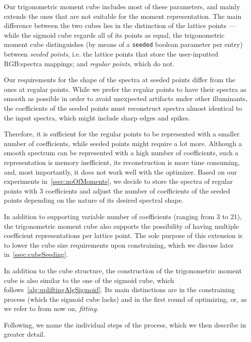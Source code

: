 Our trigonometric moment cube includes most of these parameters, and mainly extends the ones that are not suitable for the moment representation. The main difference between the two cubes lies in the distinction of the lattice points --- while the sigmoid cube regards all of its points as equal, the trigonometric moment cube distinguishes (by means of a \texttt{seeded} boolean parameter per entry) between \emph{seeded points}, i.e. the lattice points that store the user-inputted RGB:spectra mappings; and \emph{regular points}, which do not.

Our requirements for the shape of the spectra at seeded points differ from the ones at regular points. While we prefer the regular points to have their spectra as smooth as possible in order to avoid unexpected artifacts under other illuminants, the coefficients of the seeded points must reconstruct spectra almost identical to the input spectra, which might include sharp edges and spikes.

Therefore, it is sufficient for the regular points to be represented with a smaller number of coefficients, while seeded points might require a lot more. Although a smooth spectrum can be represented with a high number of coefficients, such a representation is memory inefficient, its reconstruction is more time consuming, and, most importantly, it does not work well with the optimizer. Based on our experiments in~\cref{ssec:noOfMoments}, we decide to store the spectra of regular points with 3 coefficients and adjust the number of coefficients of the seeded points depending on the nature of its desired spectral shape.

In addition to supporting variable number of coefficients (ranging from 3 to 21), the trigonometric moment cube also supports the possibility of having multiple coefficient representations per lattice point. The sole purpose of this extension is to lower the cube size requirements upon constraining, which we discuss later in~\cref{ssec:cubeSeeding}.

In addition to the cube structure, the construction of the trigonometric moment cube is also similar to the one of the sigmoid cube, which follows~\cref{alg:upliftingAlgSigmoid}. Its main distinctions are in the constraining process (which the sigmoid cube lacks) and in the first round of optimizing, or, as we refer to from now on, \emph{fitting}.

Following, we name the individual steps of the process, which we then describe in greater detail.

